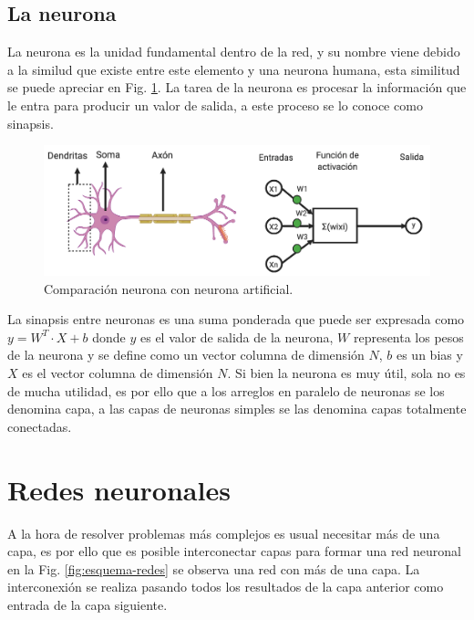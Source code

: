 \subsection{La neurona}

La neurona es la unidad fundamental dentro de la red, y su nombre viene debido a la similud que existe entre este elemento y una neurona humana, esta similitud se puede apreciar en Fig. \ref{fig:comparativa-neuronas}. La tarea de la neurona es procesar la información que le entra para producir un valor de salida, a este proceso se lo conoce como sinapsis.

\begin{figure}[h]
    \centering
    \includegraphics[width=1\textwidth]{imgs/comparacion-neurona-red.png}
    \caption{Comparación neurona con neurona artificial.}
    \label{fig:comparativa-neuronas}
\end{figure}

La sinapsis entre neuronas es una suma ponderada que puede ser expresada como $y =W^T \cdot X + b$ donde $y$ es el valor de salida de la neurona,
$W$ representa los pesos de la neurona y se define como un vector columna de dimensión $N$, $b$ es un bias y $X$ es el vector columna de dimensión $N$. Si bien la neurona es muy útil, sola no es de mucha utilidad, es por ello que a los arreglos en paralelo de neuronas se los denomina capa, a las capas de neuronas simples se las denomina capas totalmente conectadas.

\section{Redes neuronales}

A la hora de resolver problemas más complejos es usual necesitar más de una capa, es por ello que es posible interconectar capas para formar una red neuronal en la Fig. \ref{fig:esquema-redes} se observa una red con más de una capa. La interconexión se realiza pasando todos los resultados de la capa anterior como entrada de la capa siguiente.

